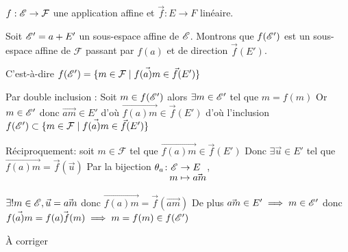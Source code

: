 \documentclass[a4paper, 12pt]{article}
\begin{document}
\begin{demonstration}
    $f: \mathscr{E} \to \mathcal{F}$ une application affine et $\vec{f}: E \to F$ linéaire.

    Soit $\mathscr{E}' = a + E'$ un sous-espace affine de $\mathscr{E}$. Montrons que $f(\mathscr{E}')$ est un sous-espace affine de $\mathcal{F}$ passant par $f(a)$ et de direction $\vec{f}(E')$.

    C'est-à-dire $f(\mathscr{E}') = \{ m \in \mathcal{F} \mid \vec{f(a)m} \in \vec{f}(E')\}$

    Par double inclusion :
    Soit $m \in f(\mathscr{E}')$ alors $\exists m \in \mathscr{E}'$ tel que $m = f(m)$
    Or $m \in \mathscr{E}'$ donc $\vec{am} \in E'$
    d'où $\vec{f(a)m} \in \vec{f}(E')$ d'où l'inclusion $f(\mathscr{E}') \subset \{m \in \mathcal{F} \mid \vec{f(a)m} \in \vec{f}(E')\}$
    
    Réciproquement: soit $m \in \mathcal{F}$ tel que $\vec{f(a)m} \in \vec{f}(E')$
    Donc $\exists \vec{u} \in E'$ tel que $\vec{f(a)m} = \vec{f}(\vec{u})$
    Par la bijection $\funcdef{\theta_a}{\E}{E}{m}{\vec{am}}$,

    $\exists! m \in \mathscr{E}, \vec{u} = \vec{am}$ donc $\vec{f(a)m} = \vec{f}(\vec{am})$
    De plus $\vec{am} \in E' \implies m \in \mathscr{E}'$ donc $\vec{f(a)m} = \vec{f(a)f(m)} \implies m = f(m) \in f(\mathscr{E}')$
    \begin{hotwarn}
    À corriger
    \end{hotwarn}
\end{demonstration}
\end{document}
